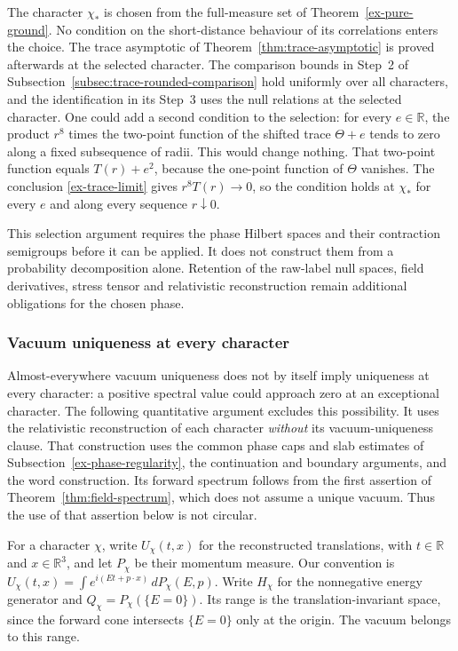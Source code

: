 \begin{remark}
\label{rem:ex-selection-ground-only}
The character \(\chi_*\) is chosen from the full-measure set of
Theorem~\ref{ex-pure-ground}. No condition on the short-distance
behaviour of its correlations enters the choice. The trace asymptotic of
Theorem~\ref{thm:trace-asymptotic} is proved afterwards at the selected
character. The comparison bounds in Step~2 of
Subsection~\ref{subsec:trace-rounded-comparison} hold uniformly over all
characters, and the identification in its Step~3 uses the null relations at
the selected character. One could add a second condition to the selection:
for every \(e\in\mathbb R\), the product \(r^8\) times the two-point function
of the shifted trace \(\Theta+e\) tends to zero along a fixed subsequence of
radii. This would change nothing. That two-point function equals
\(T(r)+e^2\), because the one-point function of \(\Theta\) vanishes. The
conclusion \eqref{ex-trace-limit} gives \(r^8T(r)\to0\), so the condition
holds at \(\chi_*\) for every \(e\) and along every sequence \(r\downarrow0\).
\end{remark}

This selection argument requires the phase Hilbert spaces and their
contraction semigroups before it can be applied. It does not construct
them from a probability decomposition alone. Retention of the raw-label
null spaces, field derivatives, stress tensor and relativistic
reconstruction remain additional obligations for the chosen phase.

\subsubsection{Vacuum uniqueness at every character}

Almost-everywhere vacuum uniqueness does not by itself imply uniqueness
at every character: a positive spectral value could approach zero at an
exceptional character. The following quantitative argument excludes this
possibility. It uses the relativistic reconstruction of each character
\emph{without} its vacuum-uniqueness clause. That construction uses the
common phase caps and slab estimates of Subsection~\ref{ex-phase-regularity},
the continuation and boundary arguments, and the word construction.
Its forward spectrum follows from the first assertion of
Theorem~\ref{thm:field-spectrum}, which does not assume a unique vacuum.
Thus the use of that assertion below is not circular.

For a character $\chi$, write $U_\chi(t,x)$ for the reconstructed
translations, with $t\in\mathbb R$ and $x\in\mathbb R^3$, and let
$P_\chi$ be their momentum measure. Our convention is
$U_\chi(t,x)=\int e^{i(Et+p\cdot x)}\,dP_\chi(E,p)$.
Write $H_\chi$ for the nonnegative energy generator and
$Q_\chi=P_\chi(\{E=0\})$. Its range is the translation-invariant
space, since the forward cone intersects $\{E=0\}$ only at the origin.
The vacuum belongs to this range.

